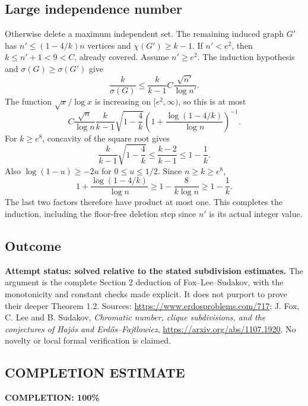 \subsection*{Large independence number}
Otherwise delete a maximum independent set. The remaining induced graph $G'$ has $n'\leq(1-4/k)n$ vertices and $\chi(G')\geq k-1$. If $n'<e^2$, then $k\leq n'+1<9<C$, already covered. Assume $n'\geq e^2$. The induction hypothesis and $\sigma(G)\geq\sigma(G')$ give
\[
 \frac{k}{\sigma(G)}
 \leq\frac{k}{k-1}C\frac{\sqrt{n'}}{\log n'}.
\]
The function $\sqrt x/\log x$ is increasing on $[e^2,\infty)$, so this is at most
\[
 C\frac{\sqrt n}{\log n}
 \frac{k}{k-1}\sqrt{1-\frac4k}
 \left(1+\frac{\log(1-4/k)}{\log n}\right)^{-1}.
\]
For $k\geq e^8$, concavity of the square root gives
\[
 \frac{k}{k-1}\sqrt{1-\frac4k}
 \leq\frac{k-2}{k-1}\leq1-\frac1k.
\]
Also $\log(1-u)\geq-2u$ for $0\leq u\leq1/2$. Since $n\geq k\geq e^8$,
\[
 1+\frac{\log(1-4/k)}{\log n}
 \geq1-\frac8{k\log n}\geq1-\frac1k.
\]
The last two factors therefore have product at most one. This completes the induction, including the floor-free deletion step since $n'$ is its actual integer value.

\subsection*{Outcome}
\textbf{Attempt status: solved relative to the stated subdivision estimates.} The argument is the complete Section 2 deduction of Fox--Lee--Sudakov, with the monotonicity and constant checks made explicit. It does not purport to prove their deeper Theorem 1.2.
Sources: \url{https://www.erdosproblems.com/717}; J. Fox, C. Lee and B. Sudakov, \emph{Chromatic number, clique subdivisions, and the conjectures of Haj\'os and Erd\H{o}s--Fajtlowicz}, \url{https://arxiv.org/abs/1107.1920}. No novelty or local formal verification is claimed.

\subsection*{COMPLETION ESTIMATE}
\textbf{COMPLETION: 100\%}
